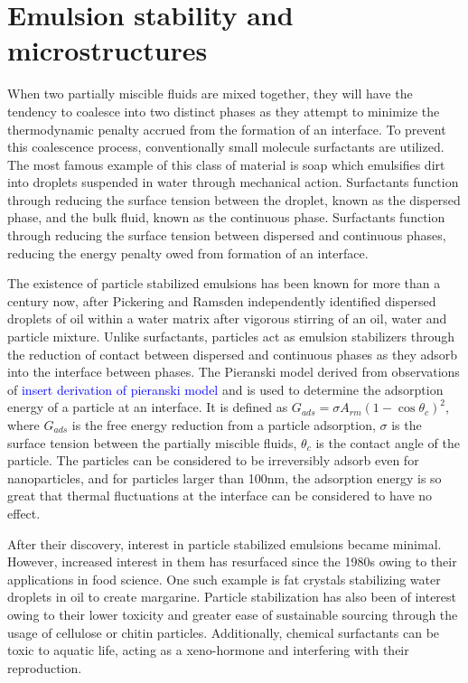 \section{Emulsion stability and microstructures}

When two partially miscible fluids are mixed together, they will have the tendency to coalesce into two distinct phases as they attempt to minimize 
the thermodynamic penalty accrued from the formation of an interface. To prevent this coalescence process, conventionally small molecule surfactants 
are utilized. The most famous example of this class of material is soap which emulsifies dirt into droplets suspended in water through mechanical action. 
Surfactants function through reducing the surface tension between the droplet, known as the dispersed phase, and the bulk fluid, known as the continuous 
phase. Surfactants function through reducing the surface tension between dispersed and continuous phases, reducing the energy penalty owed from formation 
of an interface.

The existence of particle stabilized emulsions has been known for more than a century now, after Pickering and Ramsden independently identified dispersed 
droplets of oil within a water matrix after vigorous stirring of an oil, water and particle mixture. \cite{ramsden_separation_1904, pickering_cxcvi.emulsions_1907} 
Unlike surfactants, particles act as emulsion stabilizers through the reduction of contact between dispersed and continuous phases as they adsorb into 
the interface between phases. The Pieranski model derived from observations of \textcolor{blue}{insert derivation of pieranski model} 
and is used to determine the adsorption energy of a particle at an interface. It is defined as $G_{ads} = \sigma A_{rm} (1 - \cos{\theta_c})^2$, where $G_{ads}$ 
is the free energy reduction from a particle adsorption, $\sigma$ is the surface tension between the partially miscible fluids, $\theta_c$ is the contact angle 
of the particle. The particles can be considered to be irreversibly adsorb even for nanoparticles, and for particles larger than 100nm, the adsorption energy 
is so great that thermal fluctuations at the interface can be considered to have no effect. \cite{cheung_molecular_2011}

After their discovery, interest in particle stabilized emulsions became minimal. However, increased interest in them has resurfaced since the 1980s owing to 
their applications in food science. One such example is fat crystals stabilizing water droplets in oil to create margarine. Particle stabilization has also 
been of interest owing to their lower toxicity and greater ease of sustainable sourcing through the usage of cellulose or chitin particles. 
\cite{fujisawa_nanocellulose-stabilized_2017, tang_stimuli-responsive_2016, kalliola_carboxymethyl_2018}
Additionally, chemical surfactants can be toxic to aquatic life, acting as a xeno-hormone and interfering with their reproduction. 
\cite{kaczerewska_environmental_2020, lechuga_acute_2016}

